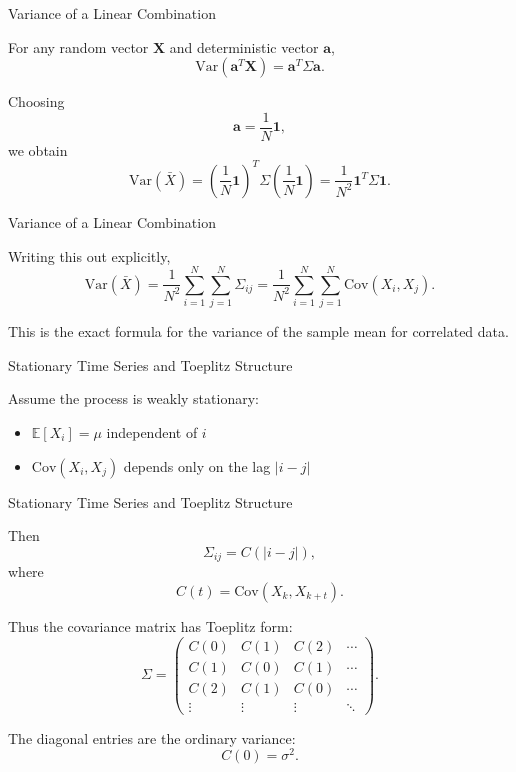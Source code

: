 \documentclass{beamer}
\begin{document}
\begin{frame}{Variance of a Linear Combination}

For any random vector $\bm{X}$ and deterministic vector $\bm{a}$,
\[
\mathrm{Var}(\bm{a}^T\bm{X}) = \bm{a}^T \Sigma \bm{a}.
\]

Choosing
\[
\bm{a} = \frac{1}{N}\bm{1},
\]
we obtain
\[
\mathrm{Var}(\bar X)
=
\left(\frac{1}{N}\bm{1}\right)^T
\Sigma
\left(\frac{1}{N}\bm{1}\right)
=
\frac{1}{N^2}\bm{1}^T\Sigma\bm{1}.
\]

\end{frame}




\begin{frame}{Variance of a Linear Combination}


Writing this out explicitly,
\[
\mathrm{Var}(\bar X)
=
\frac{1}{N^2}\sum_{i=1}^N \sum_{j=1}^N \Sigma_{ij}
=
\frac{1}{N^2}\sum_{i=1}^N \sum_{j=1}^N \mathrm{Cov}(X_i,X_j).
\]

This is the exact formula for the variance of the sample mean for correlated data.
\end{frame}


\begin{frame}{Stationary Time Series and Toeplitz Structure}

Assume the process is weakly stationary:

\begin{itemize}
\item $\mathbb{E}[X_i]=\mu$ independent of $i$
\item $\mathrm{Cov}(X_i,X_j)$ depends only on the lag $|i-j|$
\end{itemize}

\end{frame}


\begin{frame}{Stationary Time Series and Toeplitz Structure}


Then
\[
\Sigma_{ij} = C(|i-j|),
\]
where
\[
C(t)=\mathrm{Cov}(X_k,X_{k+t}).
\]

Thus the covariance matrix has Toeplitz form:
\[
\Sigma =
\begin{pmatrix}
C(0) & C(1) & C(2) & \cdots \\
C(1) & C(0) & C(1) & \cdots \\
C(2) & C(1) & C(0) & \cdots \\
\vdots & \vdots & \vdots & \ddots
\end{pmatrix}.
\]

The diagonal entries are the ordinary variance:
\[
C(0)=\sigma^2.
\]
\end{frame}
\end{document}
